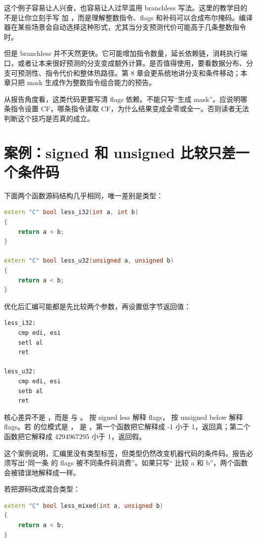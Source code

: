 这个例子容易让人兴奋，也容易让人过早滥用 branchless 写法。这里的教学目的不是让你立刻手写  加 ，而是理解整数指令、flags 和补码可以合成布尔掩码。编译器在某些场景会自动选择这种形式，尤其当分支预测代价可能高于几条整数指令时。

但是 branchless 并不天然更快。它可能增加指令数量，延长依赖链，消耗执行端口，或者让本来很好预测的分支变成额外计算。是否值得使用，要看数据分布、分支可预测性、指令代价和整体热路径。第 8 章会更系统地讲分支和条件移动；本章只把 mask 生成作为整数指令组合能力的预告。

从报告角度看，这类代码更要写清 flags 依赖。不能只写“生成 mask”。应说明哪条指令设置 CF，哪条指令读取 CF，为什么结果变成全零或全一。否则读者无法判断这个技巧是否真的成立。

\section{案例：signed 和 unsigned 比较只差一个条件码}

下面两个函数源码结构几乎相同，唯一差别是类型：

\begin{lstlisting}[language=C++]
extern "C" bool less_i32(int a, int b)
{
    return a < b;
}

extern "C" bool less_u32(unsigned a, unsigned b)
{
    return a < b;
}
\end{lstlisting}

优化后汇编可能都是先比较两个参数，再设置低字节返回值：

\begin{lstlisting}
less_i32:
    cmp edi, esi
    setl al
    ret

less_u32:
    cmp edi, esi
    setb al
    ret
\end{lstlisting}

核心差异不是 ，而是  与 。 按 signed less 解释 flags， 按 unsigned below 解释 flags。若  的位模式是 ， 是 ，第一个函数把它解释成 -1 小于 1，返回真；第二个函数把它解释成 4294967295 小于 1，返回假。

这个案例说明，汇编里没有类型标签，但类型仍然改变机器代码的条件码。报告必须写出“同一条  的 flags 被不同条件码消费”。如果只写“ 比较 a 和 b”，两个函数会被错误地解释成一样。

若把源码改成混合类型：

\begin{lstlisting}[language=C++]
extern "C" bool less_mixed(int a, unsigned b)
{
    return a < b;
}
\end{lstlisting}

